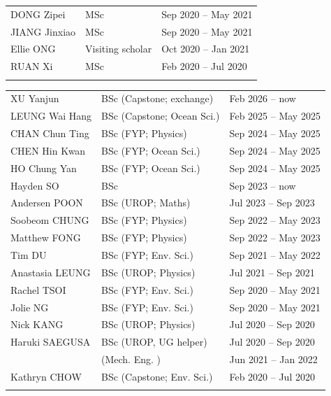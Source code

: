 \documentclass[letterpaper]{article}
\begin{document}
\begin{tabularx}{\textwidth}{XXX}
  DONG Zipei        & MSc               & Sep 2020 -- May 2021\\
  JIANG Jinxiao     & MSc               & Sep 2020 -- May 2021\\
  Ellie ONG         & Visiting scholar  & Oct 2020 -- Jan 2021\\
  RUAN Xi           & MSc               & Feb 2020 -- Jul 2020\\
  \\
\end{tabularx}
  
\begin{tabularx}{\textwidth}{XXX}
  XU Yanjun               & BSc (Capstone; exchange) & Feb 2026 -- now\\
  LEUNG Wai Hang          & BSc (Capstone; Ocean Sci.) & Feb 2025 -- May 2025\\
  CHAN Chun Ting          & BSc (FYP; Physics)    & Sep 2024 -- May 2025\\
  CHEN Hin Kwan           & BSc (FYP; Ocean Sci.) & Sep 2024 -- May 2025\\
  HO Chung Yan            & BSc (FYP; Ocean Sci.) & Sep 2024 -- May 2025\\
  Hayden SO               & BSc                   & Sep 2023 -- now\\
  Andersen POON           & BSc (UROP; Maths)     & Jul 2023 -- Sep 2023\\
  Soobeom CHUNG           & BSc (FYP; Physics)    & Sep 2022 -- May 2023\\
  Matthew FONG            & BSc (FYP; Physics)    & Sep 2022 -- May 2023\\
  Tim DU                  & BSc (FYP; Env. Sci.)  & Sep 2021 -- May 2022\\
  Anastasia LEUNG         & BSc (UROP; Physics)   & Jul 2021 -- Sep 2021\\
  Rachel TSOI             & BSc (FYP; Env. Sci.)  & Sep 2020 -- May 2021\\
  Jolie NG                & BSc (FYP; Env. Sci.)  & Sep 2020 -- May 2021\\
  Nick KANG               & BSc (UROP; Physics)   & Jul 2020 -- Sep 2020\\
  Haruki SAEGUSA          & BSc (UROP, UG helper) & Jul 2020 -- Sep 2020\\
                          &     (Mech. Eng.     ) & Jun 2021 -- Jan 2022\\
  Kathryn CHOW            & BSc (Capstone; Env. Sci.)  & Feb 2020 -- Jul 2020\\
  \\
\end{tabularx}
\end{document}
